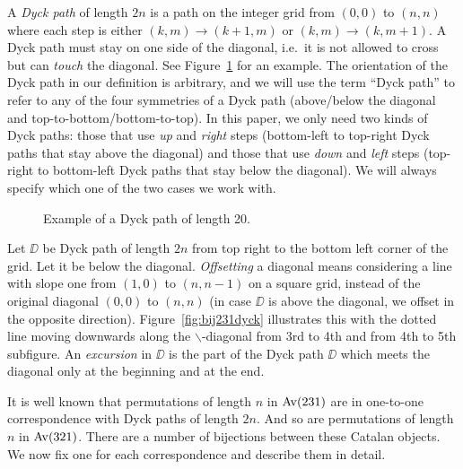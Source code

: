 A \emph{Dyck path} of length $2n$ is a path on the integer grid from $(0,0)$ to $(n,n)$ where each step is either $(k,m) \to (k+1,m)$ or $(k,m) \to (k,m+1)$. A Dyck path must stay on one side of the diagonal, i.e.~it is not allowed to cross but can \emph{touch} the diagonal. See Figure~\ref{fig:dyckexample} for an example. The orientation of the Dyck path in our definition is arbitrary, and we will use the term ``Dyck path'' to refer to any of the four symmetries of a Dyck path (above/below the diagonal and top-to-bottom/bottom-to-top). In this paper, we only need two kinds of Dyck paths: those that use \emph{up} and \emph{right} steps (bottom-left to top-right Dyck paths that stay above the diagonal) and those that use \emph{down} and \emph{left} steps (top-right to bottom-left Dyck paths that stay below the diagonal). We will always specify which one of the two cases we work with.\\
\begin{figure}[!ht]
\begin{center}
\end{center}
\caption{\small Example of a Dyck path of length 20.}
\label{fig:dyckexample}
\end{figure}

Let $\DD$ be Dyck path of length $2n$ from top right to the bottom left corner of the grid. Let it be below the diagonal. \emph{Offsetting} a diagonal means considering a line with slope one from $(1,0)$ to $(n,n-1)$ on a square grid, instead of the original diagonal $(0,0)$ to $(n,n)$ (in case $\DD$ is above the diagonal, we offset in the opposite direction). Figure~\ref{fig:bij231dyck} illustrates this with the dotted line moving downwards along the $\backslash$-diagonal from 3rd to 4th and from 4th to 5th subfigure. An \emph{excursion} in $\DD$ is the part of the Dyck path $\DD$ which meets the diagonal only at the beginning and at the end.

It is well known that permutations of length $n$ in $\mathrm{Av}(231)$ are in one-to-one correspondence with Dyck paths of length $2n$. And so are permutations of length $n$ in $\mathrm{Av}(321)$. There are a number of bijections between these Catalan objects. We now fix one for each correspondence and describe them in detail.


